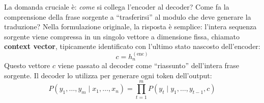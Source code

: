 La domanda cruciale è: \textit{come} si collega l'encoder al decoder? Come fa la comprensione della frase sorgente a ``trasferirsi'' al modulo che deve generare la traduzione?
Nella formulazione originale, la risposta è semplice: l'intera sequenza sorgente viene compressa in un singolo vettore a dimensione fissa, chiamato \textbf{context vector}, tipicamente identificato con l'ultimo stato nascosto dell'encoder:
\begin{equation}
c = h_n^{(\text{enc})}
\end{equation}
Questo vettore $c$ viene passato al decoder come ``riassunto'' dell'intera frase sorgente. Il decoder lo utilizza per generare ogni token dell'output:
\begin{equation}
P(y_1, \dots, y_m \mid x_1, \dots, x_n) = \prod_{t=1}^{m} P(y_t \mid y_1, \dots, y_{t-1}, c)
\end{equation}


